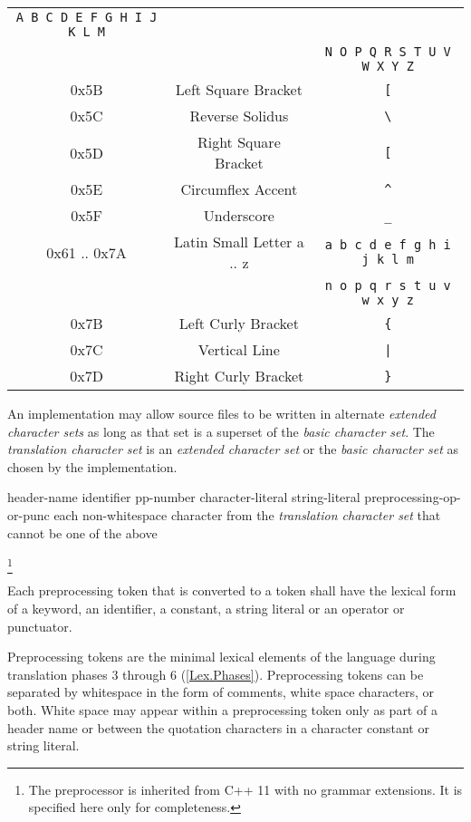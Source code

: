 \begin{center}
\begin{tabular}{|| c | c | c ||}
        \texttt{A B C D E F G H I J K L M}\\
    & & \texttt{N O P Q R S T U V W X Y Z}\\
    0x5B & Left Square Bracket & \texttt{[}\\
    0x5C & Reverse Solidus & \texttt{\textbackslash}\\
    0x5D & Right Square Bracket & \texttt{[}\\
    0x5E & Circumflex Accent & \texttt{\textasciicircum}\\
    0x5F & Underscore & \texttt{\_}\\
    0x61 .. 0x7A & Latin Small Letter a .. z &
        \texttt{a b c d e f g h i j k l m}\\
    & & \texttt{n o p q r s t u v w x y z}\\
    0x7B & Left Curly Bracket & \texttt{\{}\\
    0x7C & Vertical Line & \texttt{|}\\
    0x7D & Right Curly Bracket & \texttt{\}}\\
    \hline
  \end{tabular}
\end{center}

\p An implementation may allow source files to be written in alternate
\textit{extended character sets} as long as that set is a superset of the
\textit{basic character set}. The \textit{translation character set} is an
\textit{extended character set} or the \textit{basic character set} as chosen by
the implementation.


\begin{grammar}
  \br
  header-name\br
  identifier\br
  pp-number\br
  character-literal\br
  string-literal\br
  preprocessing-op-or-punc\br
  \textnormal{each non-whitespace character from the \textit{translation
  character set} that cannot be one of the above}
\end{grammar}\footnote{The preprocessor is inherited from C++ 11 with no
grammar extensions. It is specified here only for completeness.}

\p Each preprocessing token that is converted to a token shall have the lexical
form of a keyword, an identifier, a constant, a string literal or an operator or
punctuator.

\p Preprocessing tokens are the minimal lexical elements of the language during
translation phases 3 through 6 (\ref{Lex.Phases}). Preprocessing tokens can be
separated by whitespace in the form of comments, white space characters, or
both. White space may appear within a preprocessing token only as part of a
header name or between the quotation characters in a character constant or
string literal.

